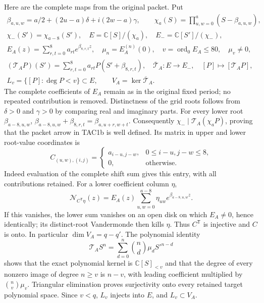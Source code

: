 Here are the complete maps from the original packet. Put
\[
\begin{gathered}
 \beta_{a,u,w}=a/2+(2u-a)\delta+i(2w-a)\gamma,\qquad
 \chi_a(S)=\prod_{u,w=0}^{a}(S-\beta_{a,u,w}),\\
 \chi_-(S')=\chi_{a-8}(S'),\quad
 E=\mathbb C[S]/(\chi_a),\quad E_-=\mathbb C[S']/(\chi_-),\\
 E_A(z)=\sum_{r,t=0}^8 a_{rt}e^{\beta_{8,r,t}z},\quad
 \mu_n=E_A^{(n)}(0),\quad v=\operatorname{ord}_0E_A\le80,
 \quad \mu_v\ne0,\\
 (\mathcal T_AP)(S')=\sum_{r,t=0}^8a_{rt}P(S'+\beta_{8,r,t}),\quad
 \overline{\mathcal T}_A:E\longrightarrow E_-,\quad
 [P]\longmapsto[\mathcal T_AP],\\
 L_v=\{[P]:\deg P<v\}\subset E,\qquad
 V_A=\ker\overline{\mathcal T}_A.
\end{gathered}\tag{TAC1b}
\]
The complete coefficients of $E_A$ remain as in the original fixed
period; no repeated contribution is removed. Distinctness of the grid
roots follows from $\delta>0$ and $\gamma>0$ by comparing real and
imaginary parts. For every lower root $\beta_{a-8,u,w}$,
$\beta_{a-8,u,w}+\beta_{8,r,t}=\beta_{a,u+r,w+t}$.
Consequently $\chi_-\mid\mathcal T_A(\chi_a P)$, proving that the
packet arrow in TAC1b is well defined. Its matrix in upper and lower
root-value coordinates is
\[
 C_{(u,w),(i,j)}=
 \begin{cases}a_{i-u,j-w},&0\le i-u,j-w\le8,\\0,&\text{otherwise}.
 \end{cases}\tag{TAC1c}
\]
Indeed evaluation of the complete shift sum gives this entry, with all
contributions retained. For a lower coefficient column $\eta$,
\[
 \mathcal N_{C^{\mathsf T}\eta}(z)
     =E_A(z)\sum_{u,w=0}^{a-8}\eta_{uw}e^{\beta_{a-8,u,w}z}.
\]
If this vanishes, the lower sum vanishes on an open disk on which
$E_A\ne0$, hence identically; its distinct-root Vandermonde then
kills $\eta$. Thus $C^{\mathsf T}$ is injective and $C$ is onto.
In particular $\dim V_A=q-q'$. The polynomial identity
\[
 \mathcal T_AS^n=\sum_{d=0}^n\binom nd\mu_dS'^{n-d}
\]
shows that the exact polynomial kernel is $\mathbb C[S]_{<v}$ and
that the degree of every nonzero image of degree $n\ge v$ is $n-v$,
with leading coefficient multiplied by $\binom nv\mu_v$.
Triangular elimination proves surjectivity onto every retained target
polynomial space. Since $v<q$, $L_v$ injects into $E$, and $L_v\subset V_A$.

